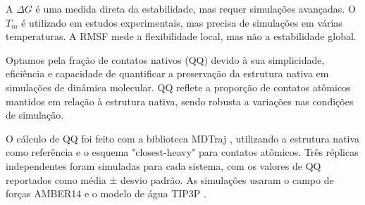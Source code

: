 \documentclass[12pt]{extarticle}
\begin{document}
A $\Delta G$ é uma medida direta da estabilidade, mas requer simulações avançadas. O $T_m$
é utilizado em estudos experimentais, mas precisa de simulações em várias
temperaturas. A RMSF mede a flexibilidade local, mas não a estabilidade global.

Optamos pela fração de contatos nativos (QQ) devido à sua simplicidade,
eficiência e capacidade de quantificar a preservação da estrutura nativa em
simulações de dinâmica molecular. QQ reflete a proporção de contatos atômicos
mantidos em relação à estrutura nativa, sendo robusta a variações nas condições
de simulação.

O cálculo de QQ foi feito com a biblioteca MDTraj \cite{McGibbon2015},
utilizando a estrutura nativa como referência e o esquema "closest-heavy" para
contatos atômicos. Três réplicas independentes foram simuladas para cada
sistema, com os valores de QQ reportados como média ± desvio padrão. As
simulações usaram o campo de forças AMBER14 \cite{Maier2015} e o modelo de água
TIP3P \cite{Jorgensen1983}.
\end{document}
